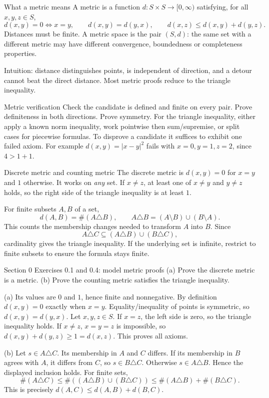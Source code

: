 \begin{note}{What a metric means}
A metric is a function $d:S\times S\to[0,\infty)$ satisfying, for all $x,y,z\in S$,
\[d(x,y)=0\iff x=y,\qquad d(x,y)=d(y,x),\qquad d(x,z)\le d(x,y)+d(y,z).\]
Distances must be finite. A metric space is the pair $(S,d)$: the same set with a different metric may have different convergence, boundedness or completeness properties.

Intuition: distance distinguishes points, is independent of direction, and a detour cannot beat the direct distance. Most metric proofs reduce to the triangle inequality.
\end{note}
\begin{method}{Metric verification}
Check the candidate is defined and finite on every pair. Prove definiteness in both directions. Prove symmetry. For the triangle inequality, either apply a known norm inequality, work pointwise then sum/supremise, or split cases for piecewise formulas. To disprove a candidate it suffices to exhibit one failed axiom. For example $d(x,y)=|x-y|^2$ fails with $x=0,y=1,z=2$, since $4>1+1$.
\end{method}
\begin{note}{Discrete metric and counting metric}
The discrete metric is $d(x,y)=0$ for $x=y$ and $1$ otherwise. It works on \emph{any} set. If $x\ne z$, at least one of $x\ne y$ and $y\ne z$ holds, so the right side of the triangle inequality is at least $1$.

For finite subsets $A,B$ of a set,
\[d(A,B)=\#(A\triangle B),\qquad A\triangle B=(A\setminus B)\cup(B\setminus A).\]
This counts the membership changes needed to transform $A$ into $B$. Since
\[A\triangle C\subseteq(A\triangle B)\cup(B\triangle C),\]
cardinality gives the triangle inequality. If the underlying set is infinite, restrict to finite subsets to ensure the formula stays finite.
\end{note}
\begin{exam}{Section 0 Exercises 0.1 and 0.4: model metric proofs}
(a) Prove the discrete metric is a metric. (b) Prove the counting metric satisfies the triangle inequality.
\end{exam}
\begin{answer}
(a) Its values are $0$ and $1$, hence finite and nonnegative. By definition $d(x,y)=0$ exactly when $x=y$. Equality/inequality of points is symmetric, so $d(x,y)=d(y,x)$. Let $x,y,z\in S$. If $x=z$, the left side is zero, so the triangle inequality holds. If $x\ne z$, $x=y=z$ is impossible, so $d(x,y)+d(y,z)\ge1=d(x,z)$. This proves all axioms.

(b) Let $s\in A\triangle C$. Its membership in $A$ and $C$ differs. If its membership in $B$ agrees with $A$, it differs from $C$, so $s\in B\triangle C$. Otherwise $s\in A\triangle B$. Hence the displayed inclusion holds. For finite sets,
\[\#(A\triangle C)\le\#((A\triangle B)\cup(B\triangle C))\le\#(A\triangle B)+\#(B\triangle C).\]
This is precisely $d(A,C)\le d(A,B)+d(B,C)$.
\end{answer}
